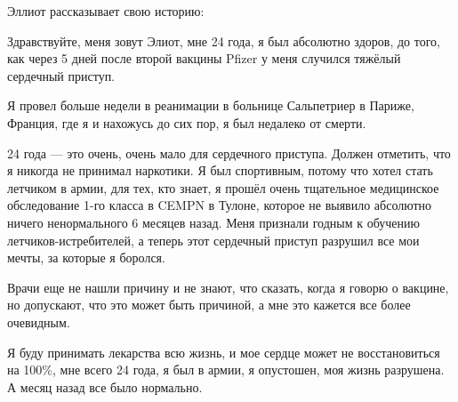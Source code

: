 Эллиот рассказывает свою историю:

Здравствуйте, меня зовут Элиот, мне 24 года, я был абсолютно здоров, до того,
как через 5 дней после второй вакцины Pfizer у меня случился тяжёлый сердечный
приступ.

Я провел больше недели в реанимации в больнице Сальпетриер в Париже, Франция,
где я и нахожусь до сих пор, я был недалеко от смерти.

24 года — это очень, очень мало для сердечного приступа. Должен отметить, что я
никогда не принимал наркотики. Я был спортивным, потому что хотел стать летчиком
в армии, для тех, кто знает, я прошёл очень тщательное медицинское обследование
1-го класса в CEMPN в Тулоне, которое не выявило абсолютно ничего ненормального
6 месяцев назад. Меня признали годным к обучению летчиков-истребителей, а теперь
этот сердечный приступ разрушил все мои мечты, за которые я боролся.

Врачи еще не нашли причину и не знают, что сказать, когда я говорю о вакцине, но
допускают, что это может быть причиной, а мне это кажется все более очевидным.

Я буду принимать лекарства всю жизнь, и мое сердце может не восстановиться на
100\%, мне всего 24 года, я был в армии, я опустошен, моя жизнь разрушена. А
месяц назад все было нормально.
